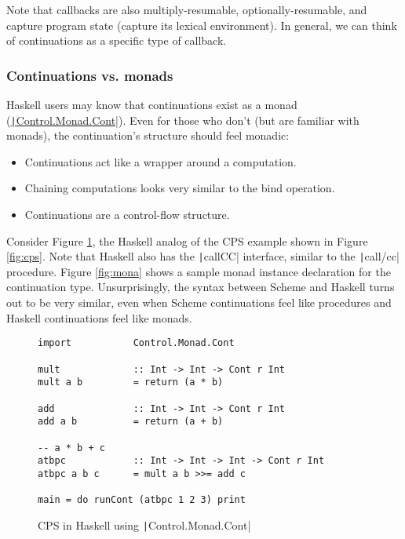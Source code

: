\documentclass[]{article}
\begin{document}
Note that callbacks are also multiply-resumable, optionally-resumable, and capture program state (capture its lexical environment). In general, we can think of continuations as a specific type of callback.

\subsubsection{Continuations vs. monads}
\label{sec:mona}

Haskell users may know that continuations exist as a monad (\href{https://hackage.haskell.org/package/mtl-2.2.2/docs/Control-Monad-Cont.html}{\texttt|Control.Monad.Cont|}). Even for those who don't (but are familiar with monads), the continuation's structure should feel monadic:
\begin{itemize}
\item Continuations act like a wrapper around a computation.
\item Chaining computations looks very similar to the bind operation.
\item Continuations are a control-flow structure.
\end{itemize}

Consider Figure \ref{fig:hask}, the Haskell analog of the CPS example shown in Figure \ref{fig:cps}. Note that Haskell also has the \texttt|callCC| interface, similar to the \texttt|call/cc| procedure. Figure \ref{fig:mona} shows a sample monad instance declaration for the continuation type. Unsurprisingly, the syntax between Scheme and Haskell turns out to be very similar, even when Scheme continuations feel like procedures and Haskell continuations feel like monads.

\begin{figure}[]
  \centering
\begin{verbatim}
import           Control.Monad.Cont

mult             :: Int -> Int -> Cont r Int
mult a b         = return (a * b)

add              :: Int -> Int -> Cont r Int
add a b          = return (a + b)

-- a * b + c
atbpc            :: Int -> Int -> Int -> Cont r Int
atbpc a b c      = mult a b >>= add c

main = do runCont (atbpc 1 2 3) print
\end{verbatim}
  \caption{CPS in Haskell using \texttt|Control.Monad.Cont|}
  \label{fig:hask}
\end{figure}
\end{document}
